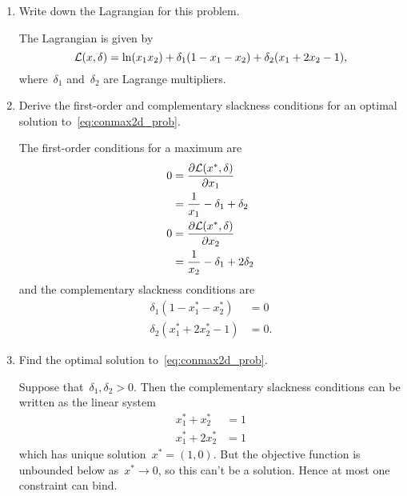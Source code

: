 \begin{enumerate}
\begin{enumerate}
\begin{solution}
\begin{center}
			\end{center}
		\end{solution}

		\item
		Write down the Lagrangian for this problem.
		\begin{solution}
			The Lagrangian is given by
			\[ \Lcal(x,\delta)%
				=\ln(x_1x_2)+\delta_1(1-x_1-x_2)+\delta_2(x_1+2x_2-1), \]
			where~$\delta_1$ and~$\delta_2$ are Lagrange multipliers.
		\end{solution}

		\item
		Derive the first-order and complementary slackness conditions for an optimal solution to~\eqref{eq:conmax2d_prob}.
		\begin{solution}
			The first-order conditions for a maximum are
			\begin{align}
				0
				&= \frac{\partial\mathcal{L}(x^*,\delta)}{\partial x_1}\\
				&= \frac{1}{x_1}-\delta_1+\delta_2\\
				0
				&= \frac{\partial\mathcal{L}(x^*,\delta)}{\partial x_2}\\
				&= \frac{1}{x_2}-\delta_1+2\delta_2
			\end{align}
			and the complementary slackness conditions are
			\begin{align}
				\delta_1(1-x_1^*-x_2^*)
				&= 0\\
				\delta_2(x_1^*+2x_2^*-1)
				&= 0.
			\end{align}
		\end{solution}

		\item
		Find the optimal solution to~\eqref{eq:conmax2d_prob}.
		\begin{solution}
			Suppose that~$\delta_1,\delta_2>0$.
			Then the complementary slackness conditions can be written as the linear system
			\begin{align}
				x_1^*+x_2^*
				&= 1 \label{eq:conmax2d_csc1} \\
				x_1^*+2x_2^*
				&= 1
			\end{align}
			which has unique solution~$x^*=(1,0)$.
			But the objective function is unbounded below as~$x^*\to0$, so this can't be a solution.
			Hence at most one constraint can bind.
			

\end{solution}
\end{enumerate}
\end{enumerate}
